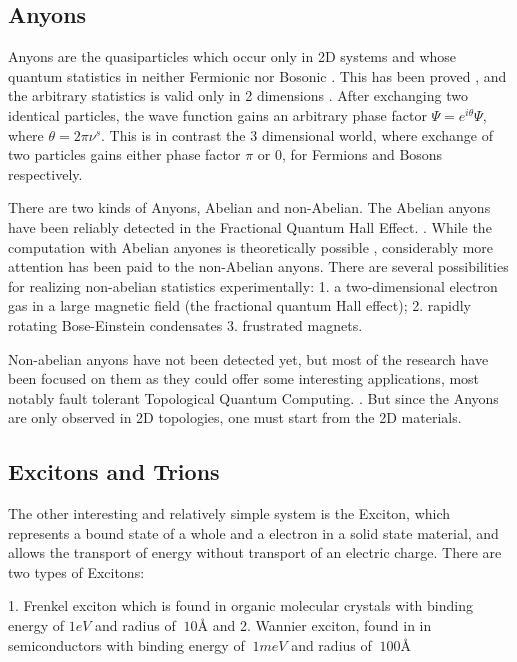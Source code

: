 \subsection*{Anyons}

Anyons are the quasiparticles which occur only in 2D systems and whose quantum statistics in neither Fermionic nor Bosonic \cite{Anyons1}.  This has been proved  \cite{Anyons2}, and the arbitrary statistics is valid only in 2 dimensions \cite{Walsh}. After exchanging two identical particles, the wave function gains an arbitrary phase factor $ \Psi = e^{i\theta}\Psi $, where $ \theta = 2\pi\nu^{s} $. This is in contrast the 3 dimensional world, where exchange of two particles gains either phase factor $ \pi $ or $ 0 $, for Fermions and Bosons respectively.

There are two kinds of Anyons, Abelian and non-Abelian. The Abelian anyons have been reliably detected in the Fractional Quantum Hall Effect. \cite{FQHE}.  While the computation with Abelian anyones is theoretically possible \cite{AbelianAnyons}, considerably more attention has been paid to the non-Abelian anyons.
There are several possibilities for realizing non-abelian statistics experimentally: 1. a two-dimensional electron gas in a large magnetic field (the fractional quantum Hall effect); 2. rapidly rotating Bose-Einstein condensates 3. frustrated magnets.

Non-abelian anyons have not been detected yet, but most of the research have been focused on them as  they could offer some interesting applications, most notably  fault tolerant Topological Quantum Computing. \cite{AnyonsTqc}. But since the Anyons are only observed in 2D topologies, one must start from the 2D materials.


\subsection{Excitons and Trions}

The other interesting and relatively simple system is the Exciton, which represents a bound state of a whole and a electron in a solid state material, and allows the transport of energy without transport of an electric charge. There are two types of Excitons: 

1. Frenkel exciton which is found in organic molecular crystals \cite{Excitons3} with binding energy of $ 1eV $ and radius of $ ~ 10\text{\AA} $ and 
2. Wannier exciton, found in in semiconductors \cite{Excitons2}  with binding energy of $ ~1meV $ and radius of $ ~100\text{\AA} $

